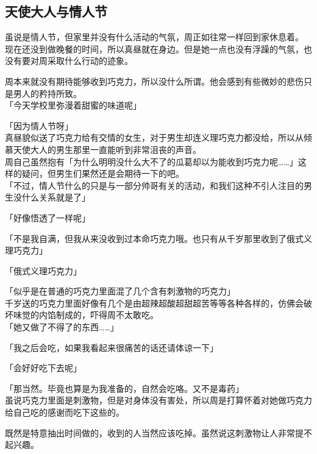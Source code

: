 \subsection{天使大人与情人节}

虽说是情人节，但家里并没有什么活动的气氛，周正如往常一样回到家休息着。\\

现在还没到做晚餐的时间，所以真昼就在身边。但是她一点也没有浮躁的气氛，也没有要对周采取什么行动的迹象。

周本来就没有期待能够收到巧克力，所以没什么所谓。他会感到有些微妙的悲伤只是男人的矜持所致。\\

「今天学校里弥漫着甜蜜的味道呢」

「因为情人节呀」\\

真昼貌似送了巧克力给有交情的女生，对于男生却连义理巧克力都没给，所以从倾慕天使大人的男生那里一直能听到非常沮丧的声音。\\

周自己虽然抱有「为什么明明没什么大不了的瓜葛却以为能收到巧克力呢……」这样的疑问，但男生们果然还是会期待一下的吧。\\

「不过，情人节什么的只是与一部分帅哥有关的活动，和我们这种不引人注目的男生没什么关系就是了」

「好像悟透了一样呢」

「不是我自满，但我从来没收到过本命巧克力哦。也只有从千岁那里收到了俄式义理巧克力」

「俄式义理巧克力」

「似乎是在普通的巧克力里面混了几个含有刺激物的巧克力」\\

千岁送的巧克力里面好像有几个是由超辣超酸超甜超苦等等各种各样的，仿佛会破坏味觉的内馅制成的，吓得周不太敢吃。\\

「她又做了不得了的东西……」

「我之后会吃，如果我看起来很痛苦的话还请体谅一下」

「会好好吃下去呢」

「那当然。毕竟也算是为我准备的，自然会吃咯。又不是毒药」\\

虽说巧克力里面是刺激物，但是对身体没有害处，所以周是打算怀着对她做巧克力给自己吃的感谢而吃下这些的。

既然是特意抽出时间做的，收到的人当然应该吃掉。虽然说这刺激物让人非常提不起兴趣。\\

